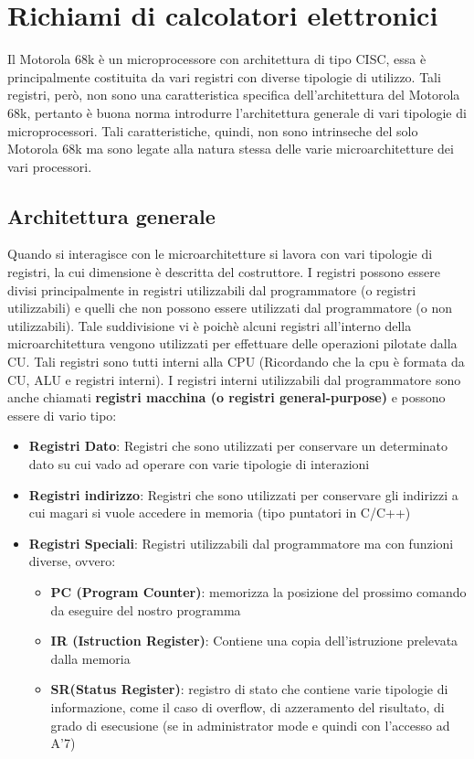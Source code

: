  \section{Richiami di calcolatori elettronici}
Il Motorola 68k è un microprocessore con architettura di tipo CISC, essa è principalmente costituita da vari registri con diverse tipologie di utilizzo. Tali registri, però, non sono una caratteristica specifica dell'architettura del Motorola 68k, pertanto è buona norma introdurre l'architettura generale di vari tipologie di microprocessori. Tali caratteristiche, quindi, non sono intrinseche del solo Motorola 68k ma sono legate alla natura stessa delle varie microarchitetture dei vari processori.

\subsection{Architettura generale}
Quando si interagisce con le microarchitetture si lavora con vari tipologie di registri, la cui dimensione è descritta del costruttore.
I registri possono essere divisi principalmente in registri utilizzabili dal programmatore (o registri utilizzabili) e quelli che non possono essere utilizzati dal programmatore (o non utilizzabili). Tale suddivisione vi è poichè alcuni registri all'interno della microarchitettura vengono utilizzati per effettuare delle operazioni pilotate dalla CU. Tali registri sono tutti interni alla CPU (Ricordando che la cpu è formata da CU, ALU e registri interni). I registri interni utilizzabili dal programmatore sono anche chiamati \textbf{registri macchina (o registri general-purpose)} e possono essere di vario tipo:

\begin{itemize}
    \item \textbf{Registri Dato}: Registri che sono utilizzati per conservare un determinato dato su cui vado ad operare con varie tipologie di interazioni
    \item \textbf{Registri indirizzo}: Registri che sono utilizzati per conservare gli indirizzi a cui magari si vuole accedere in memoria (tipo puntatori in C/C++)
    \item \textbf{Registri Speciali}: Registri utilizzabili dal programmatore ma con funzioni diverse, ovvero:
    \begin{itemize}
        \item \textbf{PC (Program Counter)}: memorizza la posizione del prossimo comando da eseguire del nostro programma
        \item \textbf{IR (Istruction Register)}: Contiene una copia dell'istruzione prelevata dalla memoria
        \item \textbf{SR(Status Register)}: registro di stato che contiene varie tipologie di informazione, come il caso di overflow, di azzeramento del risultato, di grado di esecusione (se in administrator mode e quindi con l'accesso ad A'7)
    \end{itemize}
\end{itemize}

